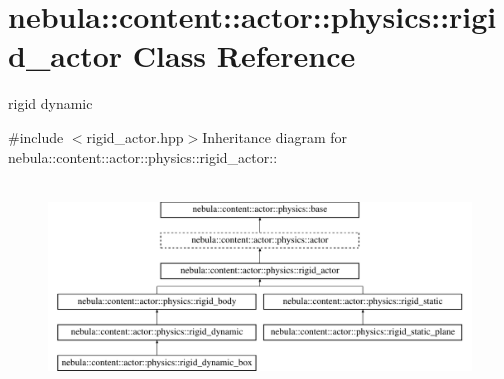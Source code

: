 \hypertarget{classnebula_1_1content_1_1actor_1_1physics_1_1rigid__actor}{
\section{nebula::content::actor::physics::rigid\_\-actor Class Reference}
\label{classnebula_1_1content_1_1actor_1_1physics_1_1rigid__actor}
}


rigid dynamic  


{\ttfamily \#include $<$rigid\_\-actor.hpp$>$}Inheritance diagram for nebula::content::actor::physics::rigid\_\-actor::\begin{figure}[H]
\begin{center}
\leavevmode
\includegraphics[height=5.5814cm]{classnebula_1_1content_1_1actor_1_1physics_1_1rigid__actor}
\end{center}
\end{figure}
